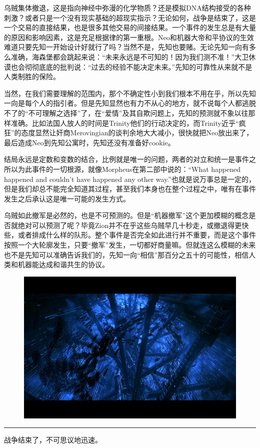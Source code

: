 \documentclass[UTF8]{ctexart}
\newcommand{\myparsep}{\noindent \rule[0.5ex]{\linewidth}{1pt}}
\begin{document}
乌贼集体撤退，这是指向神经中弥漫的化学物质？还是模拟DNA结构接受的各种刺激？或者只是一个没有现实基础的超现实指示？无论如何，战争是结束了，这是一个交易的直接结果，也是很多其他交易的间接结果。一个事件的发生总是有大量的原因和影响因素，这是充足根据律的第一重根。Neo和机器大帝和平协议的生效难道只要先知一开始设计好就行了吗？当然不是，先知也要赌。无论先知一向有多么准确，海森堡都会跳起来说：“未来永远是不可知的！因为我们测不准！”大卫休谟也会彻彻底底的批判说：“过去的经验不能决定未来。”先知的可靠性从来就不是人类制胜的保险。

当然，在我们需要理解的范围内，那个不确定性小到我们根本不用在乎，所以先知一向是每个人的指引者。但是先知显然也有力不从心的地方，就不说每个人都逃脱不了的“不可理解之选择”了，在“爱情”及其自欺问题上，先知的预测就不象以往那样准确。比如法国人放人的时间是Trinity他们的行动决定的，而Trinity近乎“疯狂”的态度显然让奸商Merovingian的谈判余地大大减小，很快就把Neo放出来了，最后造成Neo到先知公寓时，先知还没有准备好cookie。

结局永远是定数和变数的结合，比例就是唯一的问题，两者的对立和统一是事件之所以为此事件的一切根源，就像Morpheus在第二部中说的：“What happened happened and couldn't have happened any other way.”也就是说万事总是一定的，但是我们却总不能完全知道其过程，甚至我们本身也在整个过程之中，唯有在事件发生之后承认这是唯一可能的发生方式。

乌贼如此撤军是必然的，也是不可预测的。但是“机器撤军”这个更加模糊的概念是否就绝对可以预测了呢？毕竟Zion并不在乎这些乌贼早几十秒走，或撤退得更快些，或者排成什么样的队形。整个事件是否完全如此进行并不重要，而是这个事件按照一个大轮廓发生，只要“撤军”发生，一切都好商量嘛。但就连这么模糊的未来也不是先知可以准确告诉我们的，先知一向“相信”那百分之五十的可能性，相信人类和机器能达成和谐共生的协议。

\begin{figure}[htb]
\centering
\includegraphics[width=0.5\linewidth]{fig/39cd2fddf21be7dd8c10295a.jpg}
\end{figure}

\myparsep

战争结束了，不可思议地迅速。
\end{document}

